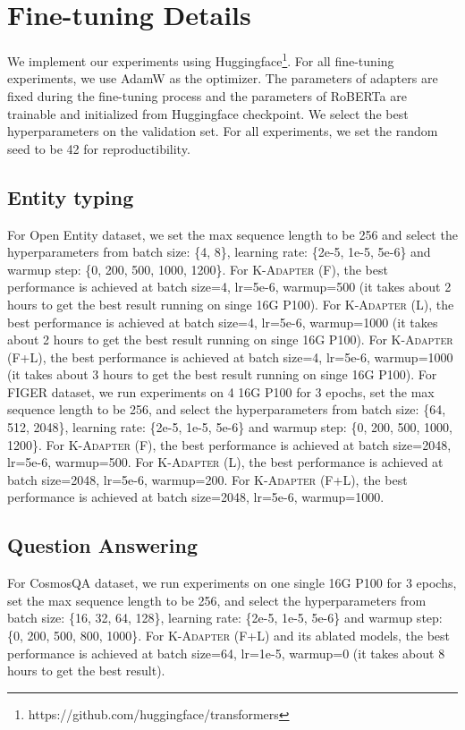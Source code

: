 \documentclass[11pt,a4paper]{article}
\begin{document}
\section{Fine-tuning Details}
We implement our experiments using Huggingface\footnote{https://github.com/huggingface/transformers}. For all fine-tuning experiments, we use AdamW as the optimizer. The parameters of adapters are fixed during the fine-tuning process and the parameters of RoBERTa are trainable and initialized from Huggingface checkpoint. We select the best hyperparameters on the validation set. For all experiments, we set the random seed to be 42 for reproductibility.

\subsection{Entity typing}



For Open Entity dataset, we set the max sequence length to be 256 and select the hyperparameters from batch size: \{4, 8\}, learning rate: \{2e-5, 1e-5, 5e-6\} and warmup step: \{0, 200, 500, 1000, 1200\}.
For \textsc{K-Adapter} (F), the best performance is achieved at batch size=4, lr=5e-6, warmup=500 (it takes about 2 hours to get the best result running on singe 16G P100).
For \textsc{K-Adapter} (L), the best performance is achieved at batch size=4, lr=5e-6, warmup=1000 (it takes about 2 hours to get the best result running on singe 16G P100).
For \textsc{K-Adapter} (F+L), the best performance is achieved at batch size=4, lr=5e-6, warmup=1000 (it takes about 3 hours to get the best result running on singe 16G P100). 
For FIGER dataset, we run experiments on 4 16G P100 for 3 epochs, set the max sequence length to be 256, and select the hyperparameters from batch size: \{64, 512, 2048\}, learning rate: \{2e-5, 1e-5, 5e-6\} and warmup step: \{0, 200, 500, 1000, 1200\}.
For \textsc{K-Adapter} (F), the best performance is achieved at batch size=2048, lr=5e-6, warmup=500.
For \textsc{K-Adapter} (L), the best performance is achieved at batch size=2048, lr=5e-6, warmup=200.
For \textsc{K-Adapter} (F+L), the best performance is achieved at batch size=2048, lr=5e-6, warmup=1000.

\subsection{Question Answering}


For CosmosQA dataset, we run experiments on one single 16G P100 for 3 epochs, set the max sequence length to be 256, and select the hyperparameters from batch size: \{16, 32, 64, 128\}, learning rate: \{2e-5, 1e-5, 5e-6\} and warmup step: \{0, 200, 500, 800, 1000\}. 
For \textsc{K-Adapter} (F+L) and its ablated models, the best performance is achieved at batch size=64, lr=1e-5, warmup=0 (it takes about 8 hours to get the best result).
\end{document}
